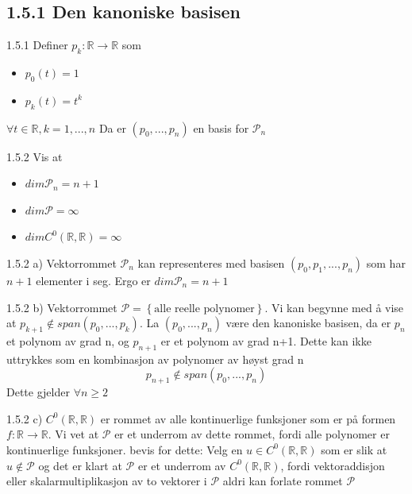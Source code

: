 \documentclass[a4paper,norsk]{article}
\renewcommand{\geq}{\geqslant}
\begin{document}
\subsection*{1.5.1 Den kanoniske basisen}

\begin{propositionbox}{1.5.1}{}
Definer $ p_k : \mathbb{R} \rightarrow \mathbb{R} $ som
\begin{itemize}
    \item $ p_0(t) = 1 $
    \item $ p_k(t) = t^k $  
\end{itemize}
$ \forall t \in  \mathbb{R}, k =1, ..., n $
Da er $ \left( p_0, ..., p_n \right)  $  en basis for $ \mathcal{P}_n $ 
\end{propositionbox}

\begin{oppgavebox}{1.5.2}{}
Vis at 
\begin{itemize}
    \item $ dim \mathcal{P}_n = n+1 $
    \item $ dim \mathcal{P} = \infty $  
    \item $ dim C^0 \left( \mathbb{R}, \mathbb{R} \right) = \infty $ 
\end{itemize}

\begin{proofbox}{1.5.2 a)}{}
Vektorrommet $ \mathcal{P}_n $ kan representeres med basisen $ \left( p_0, p_1, ..., p_n \right)  $ som har $ n+1 $ elementer i seg. Ergo er $ dim \mathcal{P}_n = n+1$ 
\end{proofbox}

\begin{proofbox}{1.5.2 b)}{}
Vektorrommet $ \mathcal{P} = \left\{ \text{alle reelle polynomer} \right\}  $. Vi kan begynne med å vise at $ p_{k+1} \notin span \left( p_0, ..., p_k \right)  $. La $ \left( p_0, ..., p_n \right)  $ være den kanoniske basisen, da er $ p_n $ et polynom av grad n, og $ p_{n+1} $ er et polynom av grad n+1. Dette kan ikke uttrykkes som en kombinasjon av polynomer av høyst grad n
\[
    p_{n+1} \notin span \left( p_0, ..., p_n \right) 
\]
Dette gjelder $ \forall n \geq 2 $ 
\end{proofbox}


\begin{proofbox}{1.5.2 c)}{}
$ C^0 \left( \mathbb{R}, \mathbb{R} \right)  $ er rommet av alle kontinuerlige funksjoner som er på formen $ f: \mathbb{R} \rightarrow \mathbb{R} $. Vi vet at $ \mathcal{P} $ er et underrom av dette rommet, fordi alle polynomer er kontinuerlige funksjoner. bevis for dette: Velg en $ u \in C^0 \left( \mathbb{R}, \mathbb{R} \right)  $ som er slik at $ u \notin \mathcal{P} $ og det er klart at $ \mathcal{P} $ er et underrom av $ C^0 \left( \mathbb{R}, \mathbb{R} \right)  $, fordi vektoraddisjon eller skalarmultiplikasjon av to vektorer i $ \mathcal{P} $ aldri kan forlate rommet $ \mathcal{P} $ 
\end{proofbox}
\end{oppgavebox}
\end{document}

